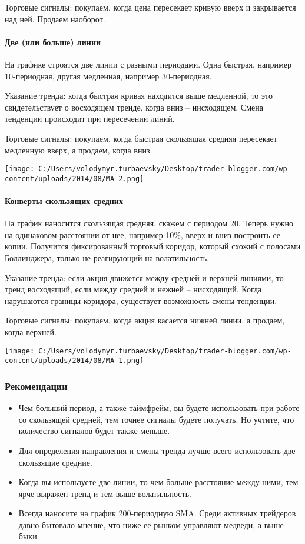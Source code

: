 \documentclass[a5paper]{article}
\begin{document}
Торговые сигналы: покупаем, когда цена пересекает кривую вверх и закрывается над ней. Продаем наоборот.

\paragraph{Две (или больше) линии}

На графике строятся две линии с разными периодами. Одна быстрая, например 10-периодная, другая медленная, например 30-периодная.

Указание тренда: когда быстрая кривая находится выше медленной, то это свидетельствует о восходящем тренде, когда вниз – нисходящем. Смена тенденции происходит при пересечении линий.

Торговые сигналы: покупаем, когда быстрая скользящая средняя пересекает медленную вверх, а продаем, когда вниз.

\texttt{[image: C:/Users/volodymyr.turbaevsky/Desktop/trader-blogger.com/wp-content/uploads/2014/08/MA-2.png]}

\paragraph{Конверты скользящих средних}

На график наносится скользящая средняя, скажем с периодом 20. Теперь нужно на одинаковом расстоянии от нее, например 10\%, вверх и вниз построить ее копии. Получится фиксированный торговый коридор, который схожий с полосами Боллинджера, только не реагирующий на волатильность.

Указание тренда: если акция движется между средней и верхней линиями, то тренд восходящий, если между средней и нежней – нисходящий. Когда нарушаются границы коридора, существует возможность смены тенденции.

Торговые сигналы: покупаем, когда акция касается нижней линии, а
продаем, когда верхней.

\texttt{[image: C:/Users/volodymyr.turbaevsky/Desktop/trader-blogger.com/wp-content/uploads/2014/08/MA-1.png]}

\subsubsection{Рекомендации}
\begin{itemize}
\item     Чем больший период, а также таймфрейм, вы будете использовать при работе со скользящей средней, тем точнее сигналы будете получать. Но учтите, что количество сигналов будет также меньше.
\item     Для определения направления и смены тренда лучше всего использовать две скользящие средние.
\item     Когда вы используете две линии, то чем больше расстояние между ними, тем ярче выражен тренд и тем выше волатильность.
\item     Всегда наносите на график 200-периодную SMA. Среди активных трейдеров давно бытовало мнение, что ниже ее рынком управляют медведи, а выше – быки.
\end{itemize}
\end{document}
